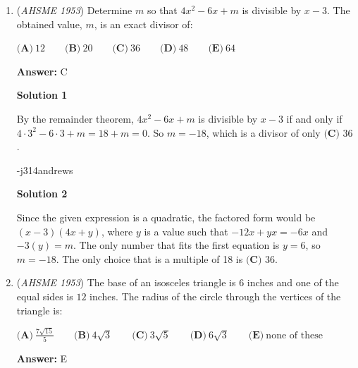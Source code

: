 \begin{enumerate}
 \textbf{Answer: }E



\textbf{Solution}

First simplify $f(x+2)$:
 \[f(x+2)=\frac{(x+2)(x+1)}{2}.\]Then simplify the answers and see which one matches.

 $f(x)+f(2)=\frac{x(x-1)}{2} + 1,$
$(x+2)f(x)=\frac{(x+2)x(x-1)}{2},$
$x(x+2)f(x)=\frac{(x+2)x^2(x-1)}{2},$
$\frac{xf(x)}{x+2}=\frac{x^2(x-1)}{2(x+2)},$
$\frac{(x+2)f(x+1)}{x}=\frac{(x+2)(x+1)}{2}.$

 Since $f(x+2)=\frac{(x+2)f(x+1)}{x}=\frac{(x+2)(x+1)}{2}$, the answer is $\boxed{\textbf{(E)}\ \frac{(x+2)f(x+1)}{x}}.$



	\item (\textit{AHSME 1953}) Determine $m$ so that $4x^2-6x+m$ is divisible by $x-3$. The obtained value, $m$, is an exact divisor of: 


 $\textbf{(A)}\ 12 \qquad \textbf{(B)}\ 20 \qquad \textbf{(C)}\ 36 \qquad \textbf{(D)}\ 48 \qquad \textbf{(E)}\ 64$

 \textbf{Answer: }C



\textbf{Solution 1}

By the remainder theorem, $4x^2-6x+m$ is divisible by $x-3$ if and only if $4\cdot 3^2 - 6\cdot 3 + m = 18 + m = 0$.  So $m = -18$, which is a divisor of only $\boxed{\textbf{(C) }36}$.

 -j314andrews

 



\textbf{Solution 2}

Since the given expression is a quadratic, the factored form would be $(x-3)(4x+y)$, where $y$ is a value such that $-12x+yx=-6x$ and $-3(y)=m$. The only number that fits the first equation is $y=6$, so $m=-18$. The only choice that is a multiple of 18 is $\boxed{\textbf{(C) }36}$.

 


	\item (\textit{AHSME 1953}) The base of an isosceles triangle is $6$ inches and one of the equal sides is $12$ inches. 
The radius of the circle through the vertices of the triangle is: 


 $\textbf{(A)}\ \frac{7\sqrt{15}}{5} \qquad \textbf{(B)}\ 4\sqrt{3} \qquad \textbf{(C)}\ 3\sqrt{5} \qquad \textbf{(D)}\ 6\sqrt{3}\qquad \textbf{(E)}\ \text{none of these}$

 \textbf{Answer: }E




\end{enumerate}

